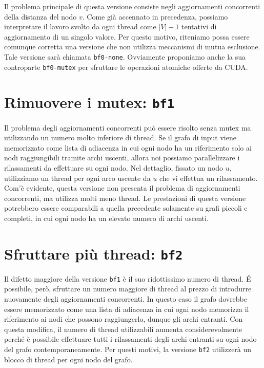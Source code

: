 \documentclass[12pt,a4paper]{book}
\begin{document}
	Il problema principale di questa versione consiste negli aggiornamenti concorrenti della distanza del nodo $v$. Come già accennato in precedenza, possiamo interpretare il lavoro svolto da ogni thread come $|V|-1$ tentativi di aggiornamento di un singolo valore. Per questo motivo, riteniamo possa essere comunque corretta una versione che non utilizza meccanismi di mutua esclusione. Tale versione sarà chiamata \texttt{bf0-none}. Ovviamente proponiamo anche la sua controparte \texttt{bf0-mutex} per sfruttare le operazioni atomiche offerte da CUDA.
	
	\section{Rimuovere i mutex: \texttt{bf1}}
	Il problema degli aggiornamenti concorrenti può essere risolto senza mutex ma utilizzando un numero molto inferiore di thread. Se il grafo di input viene memorizzato come lista di adiacenza in cui ogni nodo ha un riferimento solo ai nodi raggiungibili tramite archi uscenti, allora noi possiamo parallelizzare i rilassamenti da effettuare su ogni nodo. Nel dettaglio, fissato un nodo $u$, utilizziamo un thread per ogni arco uscente da $u$ che vi effettua un rilassamento. Com'è evidente, questa versione non presenta il problema di aggiornamenti concorrenti, ma utilizza molti meno thread. Le prestazioni di questa versione potrebbero essere comparabili a quella precedente solamente su grafi piccoli e completi, in cui ogni nodo ha un elevato numero di archi uscenti.
	
	\section{Sfruttare più thread: \texttt{bf2}}
	Il difetto maggiore della versione \texttt{bf1} è il suo ridottissimo numero di thread. \'E possibile, però, sfruttare un numero maggiore di thread al prezzo di introdurre nuovamente degli aggiornamenti concorrenti. In questo caso il grafo dovrebbe essere memorizzato come una lista di adiacenza in cui ogni nodo memorizza il riferimento ai nodi che possono raggiungerlo, dunque gli archi entranti. Con questa modifica, il numero di thread utilizzabili aumenta considerevolmente perché è possibile effettuare tutti i rilassamenti degli archi entranti su ogni nodo del grafo contemporaneamente. Per questi motivi, la versione \texttt{bf2} utilizzerà un blocco di thread per ogni nodo del grafo.
	
\end{document}

